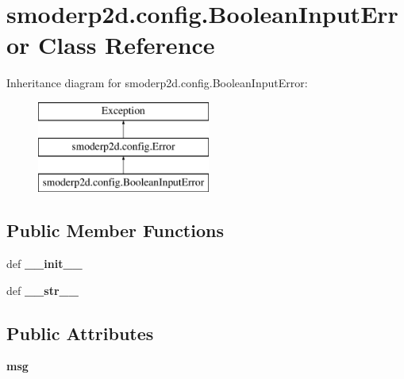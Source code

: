 \hypertarget{classsmoderp2d_1_1config_1_1BooleanInputError}{\section{smoderp2d.\-config.\-Boolean\-Input\-Error Class Reference}
\label{classsmoderp2d_1_1config_1_1BooleanInputError}
}
Inheritance diagram for smoderp2d.\-config.\-Boolean\-Input\-Error\-:\begin{figure}[H]
\begin{center}
\leavevmode
\includegraphics[height=3.000000cm]{classsmoderp2d_1_1config_1_1BooleanInputError}
\end{center}
\end{figure}
\subsection*{Public Member Functions}
\begin{DoxyCompactItemize}
\item 
\hypertarget{classsmoderp2d_1_1config_1_1BooleanInputError_a360baa4e5ed00b7e1be2f69c827bc744}{def {\bfseries \-\_\-\-\_\-init\-\_\-\-\_\-}}\label{classsmoderp2d_1_1config_1_1BooleanInputError_a360baa4e5ed00b7e1be2f69c827bc744}

\item 
\hypertarget{classsmoderp2d_1_1config_1_1BooleanInputError_a44476063da3a69ec01d9d0215fe03f17}{def {\bfseries \-\_\-\-\_\-str\-\_\-\-\_\-}}\label{classsmoderp2d_1_1config_1_1BooleanInputError_a44476063da3a69ec01d9d0215fe03f17}

\end{DoxyCompactItemize}
\subsection*{Public Attributes}
\begin{DoxyCompactItemize}
\item 
\hypertarget{classsmoderp2d_1_1config_1_1BooleanInputError_a4d9e5f70b1bb7cd8071adc203c15acc1}{{\bfseries msg}}\label{classsmoderp2d_1_1config_1_1BooleanInputError_a4d9e5f70b1bb7cd8071adc203c15acc1}

\end{DoxyCompactItemize}


